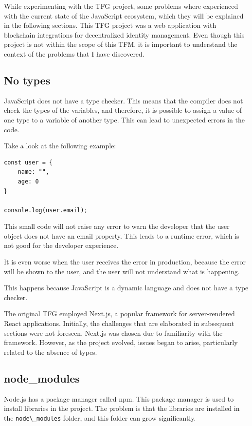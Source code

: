 \documentclass[12pt, letterpaper]{article}
\begin{document}
\begin{multicols}{2}
    While experimenting with the TFG \cite{TFG} project, some problems where experienced with the current state of the JavaScript ecosystem, which they will be explained in the following sections. This TFG project was a web application with blockchain integrations for decentralized identity management. Even though this project is not within the scope of this TFM, it is important to understand the context of the problems that I have discovered.

    \subsection{No types}
    JavaScript does not have a type checker. This means that the compiler does not check the types of the variables, and therefore, it is possible to assign a value of one type to a variable of another type. This can lead to unexpected errors in the code.

    Take a look at the following example:
    \begin{lstlisting}
const user = {
    name: "",
    age: 0
}
    
console.log(user.email);
    \end{lstlisting}

    This small code will not raise any error to warn the developer that the user object does not have an email property. This leads to a runtime error, which is not good for the developer experience.

    It is even worse when the user receives the error in production, because the error will be shown to the user, and the user will not understand what is happening.

    This happens because JavaScript is a dynamic language and does not have a type checker.

    The original TFG \cite{TFG} employed Next.js, a popular framework for server-rendered React applications. Initially, the challenges that are elaborated in subsequent sections were not foreseen. Next.js was chosen due to familiarity with the framework. However, as the project evolved, issues began to arise, particularly related to the absence of types.

    \subsection{node\_modules}

    Node.js has a package manager called npm. This package manager is used to install libraries in the project. The problem is that the libraries are installed in the \verb|node\_modules| folder, and this folder can grow significantly. \cite{BADNPM}


\end{multicols}
\end{document}
